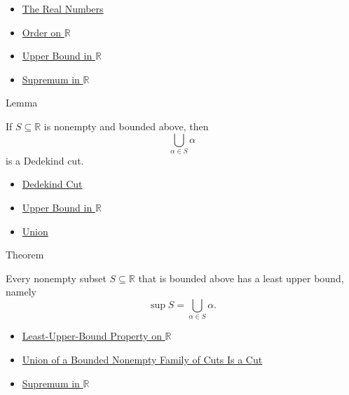 \begin{dependencies}
\begin{itemize}
  \item \hyperref[def:reals]{The Real Numbers}
  \item \hyperref[def:order-on-r]{Order on $\mathbb{R}$}
  \item \hyperref[def:upper-bound-in-r]{Upper Bound in $\mathbb{R}$}
  \item \hyperref[def:supremum-in-r]{Supremum in $\mathbb{R}$}
\end{itemize}
\end{dependencies}

\begin{lemmabox}{Lemma}
\begin{lemma}
\label{lem:union-of-cuts-is-a-cut}
If $S\subseteq\mathbb{R}$ is nonempty and bounded above, then
\[
\bigcup_{\alpha\in S}\alpha
\]
is a Dedekind cut.
\end{lemma}
\end{lemmabox}

\begin{dependencies}
\begin{itemize}
  \item \hyperref[def:dedekind-cut]{Dedekind Cut}
  \item \hyperref[def:upper-bound-in-r]{Upper Bound in $\mathbb{R}$}
  \item \hyperref[def:union]{Union}
\end{itemize}
\end{dependencies}

\begin{theorembox}{Theorem}
\begin{theorem}
\label{thm:lub-property-r}
Every nonempty subset $S\subseteq\mathbb{R}$ that is bounded above has a least
upper bound, namely
\[
\sup S=\bigcup_{\alpha\in S}\alpha.
\]
\end{theorem}
\end{theorembox}

\begin{dependencies}
\begin{itemize}
  \item \hyperref[def:least-upper-bound-property-on-r]{Least-Upper-Bound Property on $\mathbb{R}$}
  \item \hyperref[lem:union-of-cuts-is-a-cut]{Union of a Bounded Nonempty Family of Cuts Is a Cut}
  \item \hyperref[def:supremum-in-r]{Supremum in $\mathbb{R}$}
\end{itemize}
\end{dependencies}

